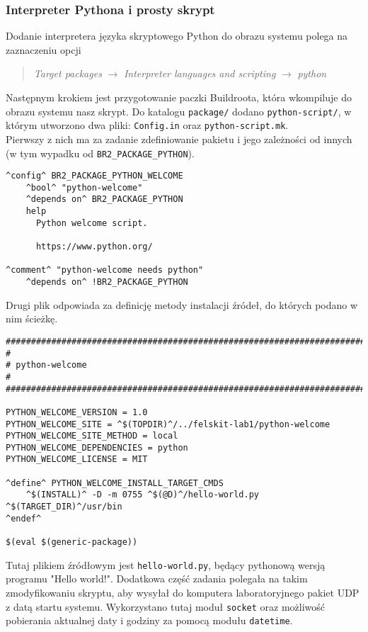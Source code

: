 \documentclass[10pt,a4paper]{article}
\begin{document}
\subsubsection{Interpreter Pythona i prosty skrypt}
Dodanie interpretera języka skryptowego Python do obrazu systemu polega na zaznaczeniu opcji
\begin{quote}
\textit{Target packages} $\rightarrow$ \textit{Interpreter languages and scripting} $\rightarrow$ \textit{python}
\end{quote}
Następnym krokiem jest przygotowanie paczki Buildroota, która wkompiluje do obrazu systemu nasz skrypt. Do katalogu \texttt{package/} dodano \texttt{python-script/}, w którym utworzono dwa pliki: \texttt{Config.in} oraz \texttt{python-script.mk}.\\[\baselineskip]
Pierwszy z nich ma za zadanie zdefiniowanie pakietu i jego zależności od innych (w tym wypadku od \texttt{BR2\_PACKAGE\_PYTHON}).
\begin{lstlisting}[style=bash, caption={Zawartość pliku Config.in}]
^config^ BR2_PACKAGE_PYTHON_WELCOME
    ^bool^ "python-welcome"
    ^depends on^ BR2_PACKAGE_PYTHON
    help
      Python welcome script.

      https://www.python.org/

^comment^ "python-welcome needs python"
    ^depends on^ !BR2_PACKAGE_PYTHON
\end{lstlisting}
Drugi plik odpowiada za definicję metody instalacji źródeł, do których podano w nim ścieżkę.
\begin{lstlisting}[style=bash, caption={Zawartość pliku python-welcome.mk}, keywordstyle=\color{black}]
################################################################################
#
# python-welcome
#
################################################################################

PYTHON_WELCOME_VERSION = 1.0
PYTHON_WELCOME_SITE = ^$(TOPDIR)^/../felskit-lab1/python-welcome
PYTHON_WELCOME_SITE_METHOD = local
PYTHON_WELCOME_DEPENDENCIES = python
PYTHON_WELCOME_LICENSE = MIT

^define^ PYTHON_WELCOME_INSTALL_TARGET_CMDS
    ^$(INSTALL)^ -D -m 0755 ^$(@D)^/hello-world.py ^$(TARGET_DIR)^/usr/bin
^endef^

$(eval $(generic-package))
\end{lstlisting}
Tutaj plikiem źródłowym jest \texttt{hello-world.py}, będący pythonową wersją programu "Hello world!". Dodatkowa część zadania polegała na takim zmodyfikowaniu skryptu, aby wysyłał do komputera laboratoryjnego pakiet UDP z datą startu systemu. Wykorzystano tutaj moduł \texttt{socket} oraz możliwość pobierania aktualnej daty i godziny za pomocą modułu \texttt{datetime}.
\end{document}
